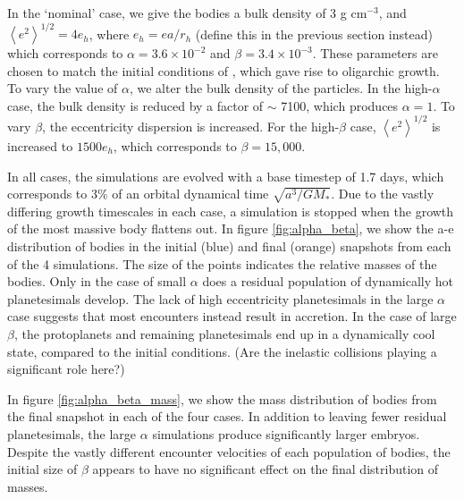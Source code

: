 \documentclass[twocolumn]{aastex63}
\begin{document}
In the `nominal' case, we give the bodies a bulk density of 3 g cm$^{-3}$, and $\left< e^{2} \right>^{1/2} = 4 e_{h}$, where $e_{h} = e a/r_{h}$ (define this in the previous section instead) which corresponds to $\alpha = 3.6 \times 10^{-2}$ and $\beta = 3.4 \times 10^{-3}$. These parameters are chosen to match the initial conditions of \citet{kokubo98}, which gave rise to oligarchic growth. To vary the value of $\alpha$, we alter the bulk density of the particles. In the high-$\alpha$ case, the bulk density is reduced by a factor of $\sim$ 7100, which produces $\alpha = 1$. To vary $\beta$, the eccentricity dispersion is increased. For the high-$\beta$ case, $\left< e^{2} \right>^{1/2}$ is increased to $1500 e_{h}$, which corresponds to $\beta = 15,000$.

In all cases, the simulations are evolved with a base timestep of 1.7 days, which corresponds to 3\% of an orbital dynamical time $\sqrt{a^3/G M_{*}}$. Due to the vastly differing growth timescales in each case, a simulation is stopped when the growth of the most massive body flattens out. In figure \ref{fig:alpha_beta}, we show the a-e distribution of bodies in the initial (blue) and final (orange) snapshots from each of the 4 simulations. The size of the points indicates the relative masses of the bodies. Only in the case of small $\alpha$ does a residual population of dynamically hot planetesimals develop. The lack of high eccentricity planetesimals in the large $\alpha$ case suggests that most encounters instead result in accretion. In the case of large $\beta$, the protoplanets and remaining planetesimals end up in a dynamically cool state, compared to the initial conditions. (Are the inelastic collisions playing a significant role here?)

In figure \ref{fig:alpha_beta_mass}, we show the mass distribution of bodies from the final snapshot in each of the four cases. In addition to leaving fewer residual planetesimals, the large $\alpha$ simulations produce significantly larger embryos. Despite the vastly different encounter velocities of each population of bodies, the initial size of $\beta$ appears to have no significant effect on the final distribution of masses.

\end{document}
